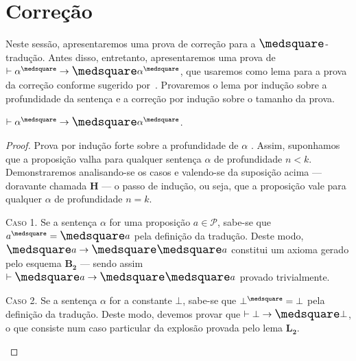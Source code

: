 \section{Correção}

    Neste sessão, apresentaremos uma prova de correção para a $\nec$-tradução. Antes disso, entretanto, apresentaremos uma prova de $\entails\alpha^\medsquare\to\nec\alpha^\medsquare$, que usaremos como lema para a prova da correção conforme sugerido por~\cite{Troelstra}. Provaremos o lema por indução sobre a profundidade da sentença e a correção por indução sobre o tamanho da prova.

    \begin{lemma}\label{square-nec}
        $\entails\alpha^\medsquare\to\nec\alpha^\medsquare$.

        \begin{proof}
            Prova por indução forte sobre a profundidade de $\alpha$ \citep{Troelstra}.
            Assim, suponhamos que a proposição valha para qualquer sentença $\alpha$ de profundidade $n<k$.
            Demonstraremos analisando-se os casos e valendo-se da suposição acima --- doravante chamada $\mathbf{H}$ --- o passo de indução, ou seja, que a proposição vale para qualquer $\alpha$ de profundidade $n=k$.

            \begin{case}
                \textsc{Caso 1.}
                Se a sentença $\alpha$ for uma proposição $a\in\mathcal{P}$, sabe-se que $a^\medsquare=\nec a$ pela definição da tradução.
                Deste modo, $\nec{a}\to\nec\nec{a}$ constitui um axioma gerado pelo esquema \hyperref[MB2]{$\mathbf{B_2}$} --- sendo assim $\entails\nec{a}\to\nec\nec{a}$ provado trivialmente.
            \end{case}

            \begin{case}
                \textsc{Caso 2.}
                Se a sentença $\alpha$ for a constante $\bot$, sabe-se que $\bot^\medsquare=\bot$ pela definição da tradução.
                Deste modo, devemos provar que $\entails\bot\to\nec\bot$, o que consiste num caso particular da explosão provada pelo lema \hyperref[explosion]{$\mathbf{L_2}$}.
            \end{case}


\end{proof}
\end{lemma}
